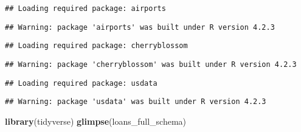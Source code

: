 \documentclass[
]{article}
\newenvironment{Shaded}{\begin{snugshade}}{\end{snugshade}}
\newcommand{\FunctionTok}[1]{\textcolor[rgb]{0.13,0.29,0.53}{\textbf{#1}}}
\newcommand{\NormalTok}[1]{#1}
\begin{document}
\begin{verbatim}
## Loading required package: airports
\end{verbatim}

\begin{verbatim}
## Warning: package 'airports' was built under R version 4.2.3
\end{verbatim}

\begin{verbatim}
## Loading required package: cherryblossom
\end{verbatim}

\begin{verbatim}
## Warning: package 'cherryblossom' was built under R version 4.2.3
\end{verbatim}

\begin{verbatim}
## Loading required package: usdata
\end{verbatim}

\begin{verbatim}
## Warning: package 'usdata' was built under R version 4.2.3
\end{verbatim}

\begin{Shaded}
\begin{Highlighting}[]
\FunctionTok{library}\NormalTok{(tidyverse)}
\FunctionTok{glimpse}\NormalTok{(loans\_full\_schema)}
\end{Highlighting}
\end{Shaded}
\end{document}

